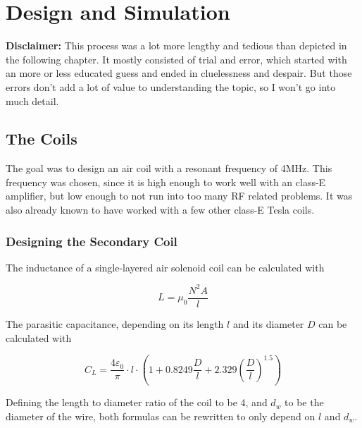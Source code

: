 \setchapterpreamble[u]{\margintoc}

\chapter{Design and Simulation} %

\textbf{Disclaimer:} This process was a lot more lengthy and tedious than depicted in the following chapter. It mostly consisted of trial and error, which started with an more or less educated guess and ended in cluelessness and despair. But those errors don't add a lot of value to understanding the topic, so I won't go into much detail.

\section{The Coils}

The goal was to design an air coil with a resonant frequency of 4MHz. This frequency was chosen, since it is high enough to work well with an class-E amplifier, but low enough to not run into too many RF related problems. It was also already known to have worked with a few other class-E Tesla coils.

\subsection{Designing the Secondary Coil}
\label{subsec:designing-the-secondary-coil}

The inductance of a single-layered air solenoid coil can be calculated with

\begin{equation}\label{eq-inductivity}
    L = \mu_0 \frac{N^2 A}{l}
\end{equation}

The parasitic capacitance, depending on its length \(l\) and its diameter \(D\) can be calculated with

\begin{equation}\label{eq-parasitic-capacitance}
    C_L = \frac{4\varepsilon_0}{\pi} \cdot l \cdot \left( 1 + 0.8249 \frac{D}{l} + 2.329 \left(\frac{D}{l}\right)^{1.5}\right)
\end{equation}

Defining the length to diameter ratio of the coil to be 4, and \(d_w\) to be the diameter of the wire, both formulas can be rewritten to only depend on \(l\) and \(d_w\). 

